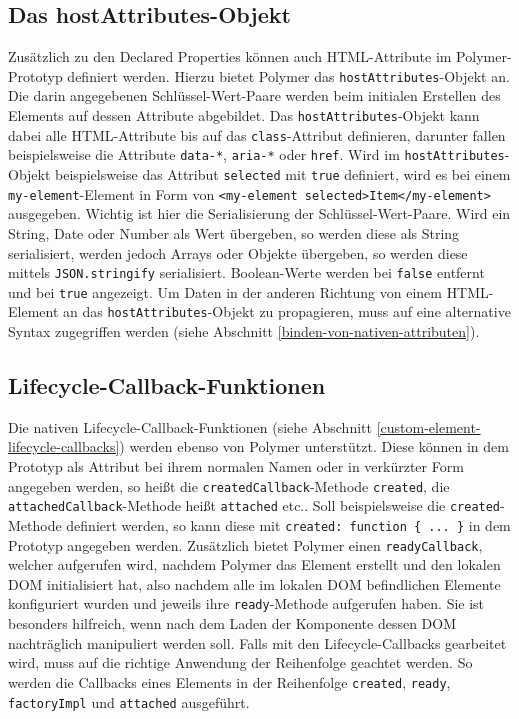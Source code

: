\subsection{Das hostAttributes-Objekt}\label{das-hostattributes-objekt}

Zusätzlich zu den Declared Properties können auch \ac{HTML}-Attribute im Polymer-Pro\-to\-typ definiert werden. Hierzu bietet Polymer das \texttt{hostAttributes}-Objekt an. Die darin angegebenen Schlüssel-Wert-Paare werden beim initialen Erstellen des Elements auf dessen Attribute abgebildet. Das \texttt{hostAttributes}-Objekt kann dabei alle \ac{HTML}-Attribute bis auf das \texttt{class}-Attribut definieren, darunter fallen beispielsweise die Attribute \texttt{data-*}, \texttt{aria-*} oder \texttt{href}. Wird im \texttt{hostAttributes}-Objekt beispielsweise das Attribut \texttt{selected} mit \texttt{true} definiert, wird es bei einem \texttt{my-element}-Element in Form von \texttt{\textless{}my-element\ selected\textgreater{}Item\textless{}/my-element\textgreater{}} ausgegeben. Wichtig ist hier die Serialisierung der Schlüssel-Wert-Paare. Wird ein String, Date oder Number als Wert übergeben, so werden diese als String serialisiert, werden jedoch Arrays oder Objekte übergeben, so werden diese mittels \texttt{JSON.stringify} serialisiert. Boolean-Werte werden bei \texttt{false} entfernt und bei \texttt{true} angezeigt. Um Daten in der anderen Richtung von einem \ac{HTML}-Element an das \texttt{hostAttributes}-Objekt zu propagieren, muss auf eine alternative Syntax zugegriffen werden (siehe Abschnitt \ref{binden-von-nativen-attributen}).


\subsection{Lifecycle-Callback-Funktionen}\label{lifecycle-callback-funktionen}

Die nativen Lifecycle-Callback-Funktionen (siehe Abschnitt \ref{custom-element-lifecycle-callbacks}) werden ebenso von Polymer unterstützt. Diese können in dem Prototyp als Attribut bei ihrem normalen Namen oder in verkürzter Form angegeben werden, so heißt die \texttt{createdCallback}-Methode \texttt{created}, die \texttt{attachedCallback}-Methode heißt \texttt{attached} etc.. Soll beispielsweise die \texttt{created}-Methode definiert werden, so kann diese mit \texttt{created:\ function\ \{\ ...\ \}} in dem Prototyp angegeben werden. Zusätzlich bietet Polymer einen \texttt{readyCallback}, welcher aufgerufen wird, nachdem Polymer das Element erstellt und den lokalen \ac{DOM} initialisiert hat, also nachdem alle im lokalen \ac{DOM} befindlichen Elemente konfiguriert wurden und jeweils ihre \texttt{ready}-Methode aufgerufen haben. Sie ist besonders hilfreich, wenn nach dem Laden der Komponente dessen \ac{DOM} nachträglich manipuliert werden soll. Falls mit den Lifecycle-Callbacks gearbeitet wird, muss auf die richtige Anwendung der Reihenfolge geachtet werden. So werden die Callbacks eines Elements in der Reihenfolge \texttt{created}, \texttt{ready}, \texttt{factoryImpl} und \texttt{attached} ausgeführt.


